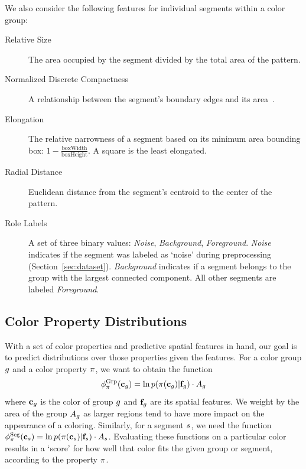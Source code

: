 We also consider the following features for individual segments within a color group:
\begin{description}
	\item[Relative Size] The area occupied by the segment divided by the total area of the pattern.
  \item[Normalized Discrete Compactness] A relationship between the segment's boundary edges and its area~\cite{NormalizedDiscreteCompactness}.
  \item[Elongation] The relative narrowness of a segment based on its minimum area bounding box: $1-\frac{\textrm{boxWidth}}{\textrm{boxHeight}}$. A square is the least elongated.
  \item[Radial Distance] Euclidean distance from the segment's centroid to the center of the pattern.
  \item[Role Labels] A set of three binary values: {\emph{Noise}, \emph{Background}, \emph{Foreground}}. \emph{Noise} indicates if the segment was labeled as `noise' during preprocessing (Section~\ref{sec:dataset}). \emph{Background} indicates if a segment belongs to the group with the largest connected component. All other segments are labeled \emph{Foreground}.
\end{description}

\subsection{Color Property Distributions}
\label{sec:unaryDistribs}

With a set of color properties and predictive spatial features in hand, our goal is to predict distributions over those properties given the features. For a color group $g$ and a color property $\pi$, we want to obtain the function
\begin{equation*}
\phi^{\textrm{Grp}}_\pi(\mathbf{c}_g) =  \ln p( \pi( \mathbf{c}_g ) | \mathbf{f}_g ) \cdot A_g
\end{equation*}
where $\mathbf{c}_g$ is the color of group $g$ and $\mathbf{f}_g$ are its spatial features. We weight by the area of the group $A_g$ as larger regions tend to have more impact on the appearance of a coloring. Similarly, for a segment $s$, we need the function $\phi^{\textrm{Seg}}_\pi(\mathbf{c}_s) = \ln p( \pi( \mathbf{c}_s ) | \mathbf{f}_s) \cdot A_s$. Evaluating these functions on a particular color results in a `score' for how well that color fits the given group or segment, according to the property $\pi$.

